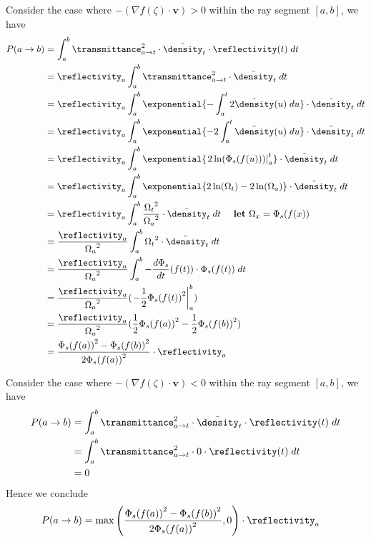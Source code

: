 Consider the case where $-(\nabla f(\zeta)\cdot \mathbf{v})>0$ within the ray segment $[a,b]$, we have
\begin{align}
P(a \rightarrow b)
&= \int_a^b \transmittance^2_{a\rightarrow t} \cdot \tilde{\density}_t \cdot \reflectivity(t)  \; dt
\\
&= \reflectivity_a \int_a^b \transmittance^2_{a\rightarrow t} \cdot \tilde{\density}_t \; dt
\\
&= \reflectivity_a \int_a^b \exponential{-\int_a^t 2\tilde{\density}(u) \; du} \cdot \tilde{\density}_t \; dt
\\
&= \reflectivity_a \int_a^b \exponential{-2\int_a^t \tilde{\density}(u) \; du} \cdot \tilde{\density}_t \; dt
\\
&= \reflectivity_a \int_a^b \exponential{\left. 2\ln(\Phi_s(f(u)))\right|_a^t} \cdot \tilde{\density}_t \; dt
\\
&= \reflectivity_a \int_a^b \exponential{2\ln(\Omega_t) - 2\ln(\Omega_a)} \cdot \tilde{\density}_t \; dt 
\\
&= \reflectivity_a \int_a^b \frac{{\Omega_t}^2}{{\Omega_a}^2} \cdot \tilde{\density}_t \; dt ~~~~\text{\textbf{let} $\Omega_x = \Phi_s(f(x))$}
\\
&= \frac{\reflectivity_a}{{\Omega_a}^2} \int_a^b {\Omega_t}^2 \cdot \tilde{\density}_t \; dt 
\\
&= \frac{\reflectivity_a}{{\Omega_a}^2} \int_a^b -\frac{d\Phi_s}{dt}(f(t)) \cdot \Phi_s(f(t)) \; dt 
\\
&= \frac{\reflectivity_a}{{\Omega_a}^2} ( \left. -\frac{1}{2}{\Phi_s(f(t))}^2 \right|_a^b) \\
&= \frac{\reflectivity_a}{{\Omega_a}^2} (\frac{1}{2}{\Phi_s(f(a))}^2 -\frac{1}{2}{\Phi_s(f(b))}^2 )\\
&= \frac{{\Phi_s(f(a))}^2 -{\Phi_s(f(b))}^2}{{2\Phi_s(f(a))}^2} \cdot \reflectivity_a 
\label{eq:homogeneous}
\end{align}

Consider the case where $-(\nabla f(\zeta)\cdot \mathbf{v})<0$ within the ray segment $[a,b]$, we have
\begin{align}
P(a \rightarrow b)
&= \int_a^b \transmittance^2_{a\rightarrow t} \cdot \tilde{\density}_t \cdot \reflectivity(t)  \; dt
\\
&= \int_a^b \transmittance^2_{a\rightarrow t} \cdot 0 \cdot \reflectivity(t)  \; dt
\\
&= 0
\end{align}
Hence we conclude 
\begin{align}
P(a \rightarrow b)
&= \max\left(\frac{{\Phi_s(f(a))}^2 -{\Phi_s(f(b))}^2}{{2\Phi_s(f(a))}^2},0\right) \cdot \reflectivity_a 
\end{align}


